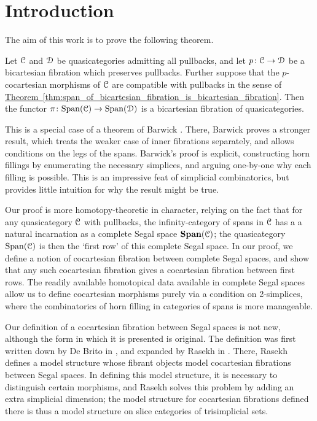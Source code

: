 \documentclass[main.tex]{subfiles}
\begin{document}
\section*{Introduction}
\label{sec:introduction}

The aim of this work is to prove the following theorem.

\begin{theorem*}
  Let $\mathcal{C}$ and $\mathcal{D}$ be quasicategories admitting all pullbacks, and let $p\colon \mathcal{C} \to \mathcal{D}$ be a bicartesian fibration which preserves pullbacks. Further suppose that the $p$-cocartesian morphisms of $\mathcal{C}$ are compatible with pullbacks in the sense of \hyperref[thm:span_of_bicartesian_fibration_is_bicartesian_fibration]{Theorem~\ref*{thm:span_of_bicartesian_fibration_is_bicartesian_fibration}}. Then the functor $\pi\colon \mathrm{Span}(\mathcal{C}) \to \mathrm{Span}(\mathcal{D})$ is a bicartesian fibration of quasicategories.
\end{theorem*}

This is a special case of a theorem of Barwick \cite{spectralmackeyfunctors1}. There, Barwick proves a stronger result, which treats the weaker case of inner fibrations separately, and allows conditions on the legs of the spans. Barwick's proof is explicit, constructing horn fillings by enumerating the necessary simplices, and arguing one-by-one why each filling is possible. This is an impressive feat of simplicial combinatorics, but provides little intuition for why the result might be true.

Our proof is more homotopy-theoretic in character, relying on the fact that for any quasicategory $\mathcal{C}$ with pullbacks, the infinity-category of spans in $\mathcal{C}$ has a a natural incarnation as a complete Segal space $\mathbf{Span}(\mathcal{C})$; the quasicategory $\mathrm{Span}(\mathcal{C})$ is then the `first row' of this complete Segal space. In our proof, we define a notion of cocartesian fibration between complete Segal spaces, and show that any such cocartesian fibration gives a cocartesian fibration between first rows. The readily available homotopical data available in complete Segal spaces allow us to define cocartesian morphisms purely via a condition on 2-simplices, where the combinatorics of horn filling in categories of spans is more manageable.

Our definition of a cocartesian fibration between Segal spaces is not new, although the form in which it is presented is original. The definition was first written down by De Brito in \cite{2016arXiv160500706B}, and expanded by Rasekh in \cite{rasekhcartesianfibrations}. There, Rasekh defines a model structure whose fibrant objects model cocartesian fibrations between Segal spaces. In defining this model structure, it is necessary to distinguish certain morphisms, and Rasekh solves this problem by adding an extra simplicial dimension; the model structure for cocartesian fibrations defined there is thus a model structure on slice categories of trisimplicial sets.
\end{document}
